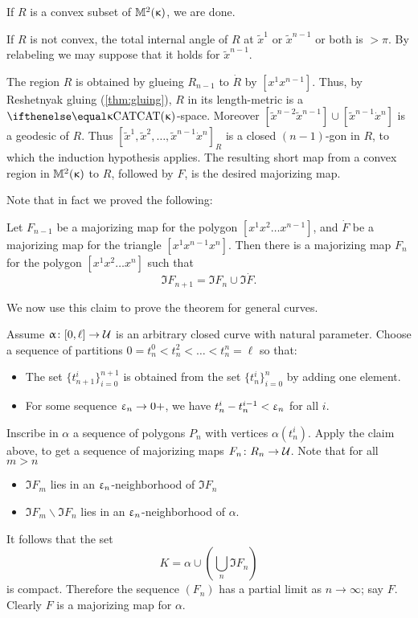 If $R$ is a convex subset of $\mathbb{M}_{{}}^{2}({\upkappa})$, we are done. 

If $R$ is not convex,  the total internal angle of $R$ at $\tilde x^1$ or $ \tilde x^{n-1} $ or both is $>\pi$.  
By relabeling we may suppose that it holds for $\tilde x^{n-1}$.  

The region $R$ is obtained by glueing $R_{n-1}$ to $\dot R$ by $[x^1x^{n-1}]$.
Thus, by Reshetnyak gluing (\ref{thm:gluing}), $R$ in its length-metric is a $\CAT{\kappa}$-space.  
Moreover $[\tilde x^{n-2}\tilde x^{n-1}]\cup[\tilde x^{n-1} \dot x^n]$ is a geodesic of $R$.
Thus $[\tilde x^1, \tilde x^2, \dots, \tilde x^{n-1} \dot x^n]_R$ is a closed $(n-1)$-gon in $R$, to which the induction hypothesis applies. The resulting short map from a convex region in $ \mathbb{M}_{{}}^{2}({\upkappa})$ to $R$, followed by $F$,  is the desired majorizing map.

\medskip

Note that in fact we proved the following:

\begin{clm}{}
Let $F_{n-1}$ be a majorizing map for the polygon $[x^1x^2\dots x^{n-1}]$,
and $\dot F$ be a majorizing map for the triangle $[x^1x^{n-1}x^{n}]$.
Then there is a majorizing map $F_n$ for the polygon $[x^1x^2\dots x^n]$
such that \[\Im F_{n+1}= \Im F_n\cup\Im \dot F.\]

\end{clm}

We now use this claim to prove the theorem for general curves.

Assume $\alpha\:[0,\ell]\to\spc{U}$ is an  arbitrary closed curve with natural parameter.
Choose a sequence of partitions $0=t^0_n<t^2_n<\dots<t^n_n=\ell$
so that:
\begin{itemize}
\item The set $\{t_{n+1}^i\}_{i=0}^{n+1}$ 
is obtained from the set  $\{t_n^i\}_{i=0}^n$ by adding one element.
\item For some sequence $\eps_n\to0+$,
we have $t^i_n-t^{i-1}_n<\upvarepsilon_n$ for all $i$.
\end{itemize}

Inscribe in $\alpha$ a sequence of polygons $P_n$ with vertices $\alpha(t^i_n)$.
Apply the claim above, to get a sequence of majorizing maps $F_n\:R_n\to\spc{U}$.
Note that for all $m>n$
\begin{itemize}
\item $\Im F_m$ lies in an  $\upvarepsilon_n$-neighborhood of $\Im F_n$
\item $\Im F_m\backslash \Im F_n$ lies in an  $\upvarepsilon_n$-neighborhood of $\alpha$.
\end{itemize}
It follows that the set
\[K=\alpha\cup\left(\bigcup_n\Im F_n\right)\]
is compact.
Therefore the sequence $(F_n)$
has a partial limit as $n\to\infty$; 
say $F$.
Clearly $F$ is a majorizing map for $\alpha$.
\qeds


